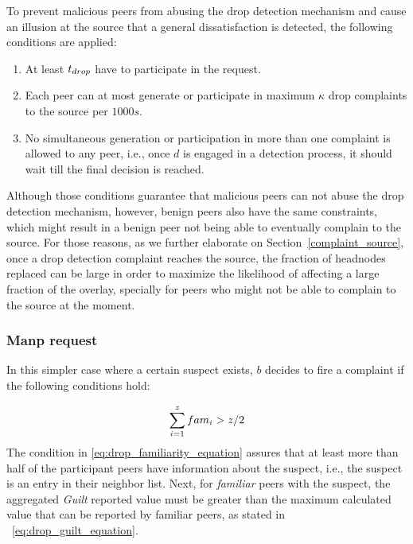 To prevent malicious peers from abusing the drop detection mechanism and cause an illusion at the source that a general dissatisfaction is detected, the following conditions are applied: 
\begin{enumerate}
\item At least $t_{drop}$ have to participate in the request. 
 \item Each peer can at most generate or participate in maximum $\kappa$ drop complaints to the source per $1000s$.
 \item No simultaneous generation or participation in more than one complaint is allowed to any peer, i.e., once $d$ is engaged in a detection process, it should wait till the final decision is reached.
\end{enumerate}
Although those conditions guarantee that malicious peers can not abuse the drop detection mechanism,
however, benign peers also have the same constraints, which might result in a benign peer not being able to eventually complain to the source.
For those reasons, as we further elaborate on Section~\ref{complaint_source}, once a drop detection complaint reaches the source, the fraction of headnodes replaced can be large in order to maximize the likelihood of affecting a large fraction of the overlay, specially for peers who might not be able to complain to the source at the moment.

\subsubsection*{Manp request}
In this simpler case where a certain suspect exists, $b$ decides to fire a complaint if the following conditions hold:

\begin{align}
\label{eq:drop_familiarity_equation}
\sum_{i=1}^{z} \fami_i > z/2
\end{align}
The condition in \ref{eq:drop_familiarity_equation} assures that at least more than half of the participant peers have information about the suspect, i.e., the suspect is an entry in their neighbor list.
Next, for \textit{familiar} peers with the suspect, the aggregated \textit{Guilt} reported value must be greater than the maximum calculated value that can be reported by familiar peers, as stated in ~\ref{eq:drop_guilt_equation}.

